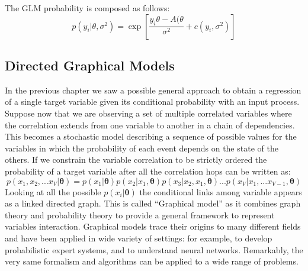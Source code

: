 The GLM probability is composed as follows:
\begin{equation}
    p(y_i| \theta, \sigma^2) = 
    \exp{\left[ \frac{y_i\theta - A(\theta}{\sigma^2} + c(y_i,\sigma^2) \right] }
\end{equation}


%
%




\subsection{Directed Graphical Models}
In the previous chapter we saw a possible general approach to obtain a regression of a single target variable given its conditional probability with an input process. Suppose now that we are observing a set of multiple correlated variables where the correlation extends from one variable to another in a chain of dependencies. This becomes a stochastic model describing a sequence of possible values for the variables in which the probability of each event depends on the state of the others.
If we constrain the variable correlation to be strictly ordered the probability of a target variable after all the correlation hops can be written as:
\begin{equation}
    p(x_1, x_2, ... x_V | \bm{\theta}) = p(x_1|\bm{\theta})p(x_2|x_1,\bm{\theta})p(x_3|x_2,x_1,\bm{\theta}) ... p(x_V|x_1, ... x_{V-1},\bm{\theta})
\end{equation}
Looking at all the possible $p(x_i|\bm{\theta})$ the conditional links among variable appears as a linked directed graph.
%
This is called “Graphical model” as it combines graph theory and probability theory to provide a general framework to represent variables interaction. Graphical models trace their origins to many different fields and have been applied in wide variety of settings: for example, to develop probabilistic expert systems, and to understand neural networks. Remarkably, the very same formalism and algorithms can be applied to a wide range of problems.
%
